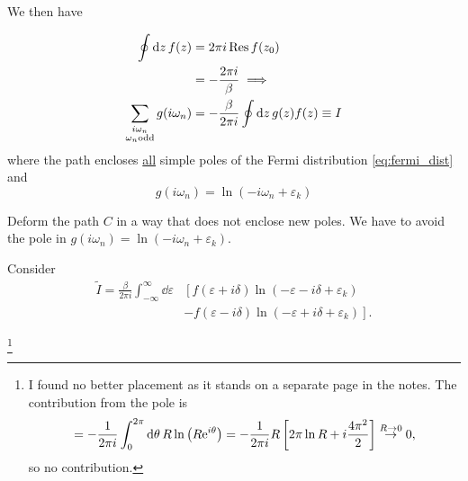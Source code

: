 We then have

\begin{align}
\oint \dd{z}f(z) &= 2\pi i \Res f(z_0) \\ 
&= -\frac{2\pi i}{\beta} \implies \\
\sum_{\substack{i\omega_n \\ \omega_n \text{odd}}} g(i\omega_n) &= -\frac{\beta}{2\pi i}\oint \dd{z}g(z)f(z)\equiv I
\end{align}
where the path encloses \underline{all} simple poles of the Fermi distribution \eqref{eq:fermi_dist} and 
\begin{equation}
g(i\omega_n)=\ln(-i\omega_n + \varepsilon_k)
\end{equation}


\begin{figure}
\centering

\end{figure}

\begin{figure}
\centering
\label{fig:path_deform}
\begin{subfigure}{0.49\textwidth}


\end{subfigure}
\begin{subfigure}{0.49\textwidth}


\end{subfigure}
\end{figure}

Deform the path $C$ in a way that does not enclose new poles. We have to avoid the pole in $g(i\omega_n) = \ln(-i\omega_n + \varepsilon_k)$.

Consider 
\begin{align}
\tilde{I} = \frac{\beta}{2\pi i}\int_{-\infty}^\infty\dd{\varepsilon}&\left[f(\varepsilon + i\delta)\ln\left(-\varepsilon -i\delta + \varepsilon_k\right) \right.\nonumber\\
&\left.-f(\varepsilon-i\delta)\ln\left(-\varepsilon  + i\delta + \varepsilon_k\right) \right].
\end{align}

\footnote{I found no better placement as it stands on a separate page in the notes. The contribution from the pole is
\begin{equation*}
= -\frac{1}{2\pi i}\int_0^{2\pi}\dd{\theta}R\ln\left(R\mathrm{e}^{i\theta}\right) = -\frac{1}{2\pi i} R\left[2\pi\ln R + i\frac{4\pi^2}{2}\right]
 \stackrel{R \rightarrow 0}{\rightarrow}  0,
\end{equation*}
so no contribution.
}

